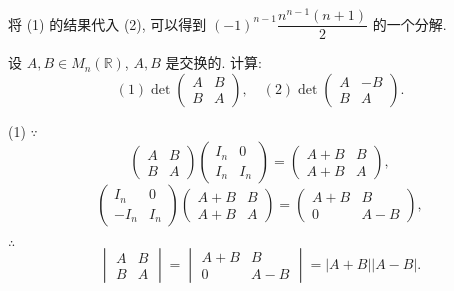 \documentclass{ctexart}
\begin{document}
\begin{note}
    将 (1) 的结果代入 (2), 可以得到 $(-1)^{n-1}\dfrac{n^{n-1}(n+1)}{2}$ 的一个分解.
\end{note}
\begin{exercisec}
    设 $A,B\in M_n(\mathbb{R})$, $A,B$ 是交换的. 计算:
    \[(1)\det\begin{pmatrix}
        A & B \\
        B & A
    \end{pmatrix},\quad(2)\det\begin{pmatrix}
        A & -B \\
        B & A
    \end{pmatrix}.\]
\end{exercisec}
\begin{solution}
    (1) $\because$
    \[\begin{pmatrix}
        A & B \\
        B & A
    \end{pmatrix}\begin{pmatrix}
        I_n & 0 \\
        I_n & I_n
    \end{pmatrix}=\begin{pmatrix}
        A+B & B \\
        A+B & A
    \end{pmatrix},\]
    \[\begin{pmatrix}
        I_n & 0 \\
        -I_n & I_n
    \end{pmatrix}\begin{pmatrix}
        A+B & B \\
        A+B & A
    \end{pmatrix}=\begin{pmatrix}
        A+B & B \\
        0 & A-B
    \end{pmatrix},\]

    $\therefore$
    \[\begin{vmatrix}
        A & B \\
        B & A
    \end{vmatrix}=\begin{vmatrix}
        A+B & B \\
        0 & A-B
    \end{vmatrix}=|A+B||A-B|.\]


\end{solution}
\end{document}
